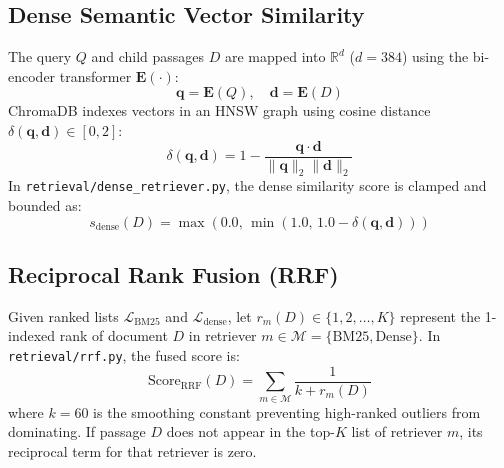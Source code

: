\documentclass[10pt,twocolumn]{article}
\begin{document}
\subsection{Dense Semantic Vector Similarity}
The query $Q$ and child passages $D$ are mapped into $\mathbb{R}^{d}$ ($d = 384$) using the bi-encoder transformer $\mathbf{E}(\cdot)$:
\begin{equation}
\mathbf{q} = \mathbf{E}(Q), \quad \mathbf{d} = \mathbf{E}(D)
\end{equation}
ChromaDB indexes vectors in an HNSW graph using cosine distance $\delta(\mathbf{q}, \mathbf{d}) \in [0, 2]$:
\begin{equation}
\delta(\mathbf{q}, \mathbf{d}) = 1 - \frac{\mathbf{q} \cdot \mathbf{d}}{\|\mathbf{q}\|_2 \|\mathbf{d}\|_2}
\end{equation}
In \texttt{retrieval/dense\_retriever.py}, the dense similarity score is clamped and bounded as:
\begin{equation}
s_{\text{dense}}(D) = \max\left(0.0, \, \min\left(1.0, \, 1.0 - \delta(\mathbf{q}, \mathbf{d})\right)\right)
\label{eq:dense_sim}
\end{equation}

\subsection{Reciprocal Rank Fusion (RRF)}
Given ranked lists $\mathcal{L}_{\text{BM25}}$ and $\mathcal{L}_{\text{dense}}$, let $r_m(D) \in \{1, 2, \dots, K\}$ represent the 1-indexed rank of document $D$ in retriever $m \in \mathcal{M} = \{\text{BM25}, \text{Dense}\}$. In \texttt{retrieval/rrf.py}, the fused score is:
\begin{equation}
\text{Score}_{\text{RRF}}(D) = \sum_{m \in \mathcal{M}} \frac{1}{k + r_m(D)}
\label{eq:rrf}
\end{equation}
where $k = 60$ is the smoothing constant preventing high-ranked outliers from dominating. If passage $D$ does not appear in the top-$K$ list of retriever $m$, its reciprocal term for that retriever is zero.
\end{document}
